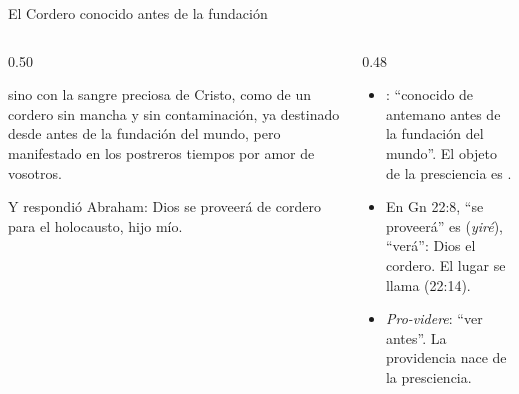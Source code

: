 \begin{frame}{El Cordero conocido antes de la fundación}
\begin{columns}[t,onlytextwidth]
\begin{column}{0.50\textwidth}
\begin{cita}sino con la sangre preciosa de Cristo, como de un cordero sin mancha y sin contaminación, ya destinado desde antes de la fundación del mundo, pero manifestado en los postreros tiempos por amor de vosotros.\end{cita}
\begin{cita}Y respondió Abraham: Dios se proveerá de cordero para el holocausto, hijo mío.\end{cita}
\end{column}
\begin{column}{0.48\textwidth}\small
\begin{itemize}
\item {}: ``conocido de antemano antes de la fundación del mundo''. El objeto de la presciencia es .
\item En Gn 22:8, ``se proveerá'' es  (\emph{yiré}), ``verá'': Dios  el cordero. El lugar se llama  (22:14).
\item \emph{Pro-videre}: ``ver antes''. La providencia nace de la presciencia.
\end{itemize}
\end{column}
\end{columns}
\end{frame}

